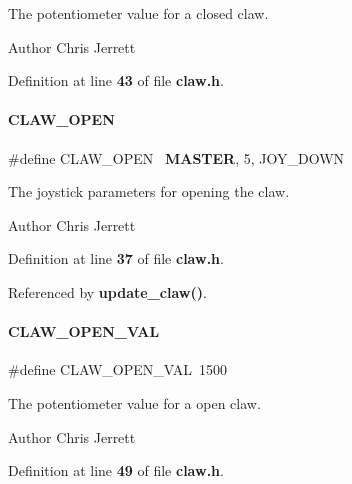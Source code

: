 The potentiometer value for a closed claw. 

\begin{DoxyAuthor}{Author}
Chris Jerrett 
\end{DoxyAuthor}


Definition at line \textbf{ 43} of file \textbf{ claw.\+h}.

\mbox{\label{claw_8h_ae42993ee3f6f4a0e47f99060fe736ba0}} 
\paragraph{C\+L\+A\+W\+\_\+\+O\+P\+EN}
{\footnotesize\ttfamily \#define C\+L\+A\+W\+\_\+\+O\+P\+EN~\textbf{ M\+A\+S\+T\+ER}, 5, J\+O\+Y\+\_\+\+D\+O\+WN}



The joystick parameters for opening the claw. 

\begin{DoxyAuthor}{Author}
Chris Jerrett 
\end{DoxyAuthor}


Definition at line \textbf{ 37} of file \textbf{ claw.\+h}.



Referenced by \textbf{ update\+\_\+claw()}.

\mbox{\label{claw_8h_a519372d8dfa1706d706053ab035ea0b9}} 
\paragraph{C\+L\+A\+W\+\_\+\+O\+P\+E\+N\+\_\+\+V\+AL}
{\footnotesize\ttfamily \#define C\+L\+A\+W\+\_\+\+O\+P\+E\+N\+\_\+\+V\+AL~1500}



The potentiometer value for a open claw. 

\begin{DoxyAuthor}{Author}
Chris Jerrett 
\end{DoxyAuthor}


Definition at line \textbf{ 49} of file \textbf{ claw.\+h}.

\mbox{\label{claw_8h_ae3be50b28977dac719f086e131ba8fd7}} 
